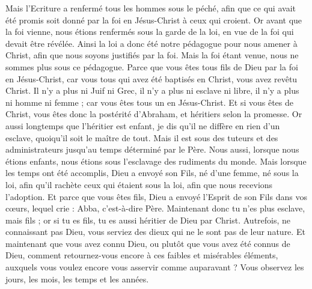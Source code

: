 \begin{multicols}{2}
Mais l'Ecriture a renfermé tous les hommes sous le péché, afin que ce qui avait été promis soit donné par la foi en Jésus-Christ à ceux qui croient.
Or avant que la foi vienne, nous étions renfermés sous la garde de la loi, en vue de la foi qui devait être révélée.
Ainsi la loi a donc été notre pédagogue pour nous amener à Christ, afin que nous soyons justifiés par la foi.
Mais la foi étant venue, nous ne sommes plus sous ce pédagogue.
Parce que vous êtes tous fils de Dieu par la foi en Jésus-Christ,
car vous tous qui avez été baptisés en Christ, vous avez revêtu Christ.
Il n'y a plus ni Juif ni Grec, il n’y a plus ni esclave ni libre, il n’y a plus ni homme ni femme ; car vous êtes tous un en Jésus-Christ.
Et si vous êtes de Christ, vous êtes donc la postérité d'Abraham, et héritiers selon la promesse.
\VerseOne{}Or aussi longtemps que l’héritier est enfant, je dis qu’il ne diffère en rien d’un esclave, quoiqu’il soit le maître de tout.
Mais il est sous des tuteurs et des administrateurs jusqu'au temps déterminé par le Père.
Nous aussi, lorsque nous étions enfants, nous étions sous l’esclavage des rudiments du monde.
Mais lorsque les temps ont été accomplis, Dieu a envoyé son Fils, né d'une femme, né sous la loi,
afin qu'il rachète ceux qui étaient sous la loi, afin que nous recevions l'adoption.
Et parce que vous êtes fils, Dieu a envoyé l'Esprit de son Fils dans vos cœurs, lequel crie : Abba, c'est-à-dire Père.
Maintenant donc tu n'es plus esclave, mais fils ; or si tu es fils, tu es aussi héritier de Dieu par Christ.
Autrefois, ne connaissant pas Dieu, vous serviez des dieux qui ne le sont pas de leur nature.
Et maintenant que vous avez connu Dieu, ou plutôt que vous avez été connus de Dieu, comment retournez-vous encore à ces faibles et misérables éléments, auxquels vous voulez encore vous asservir comme auparavant ?
Vous observez les jours, les mois, les temps et les années.

\end{multicols}
